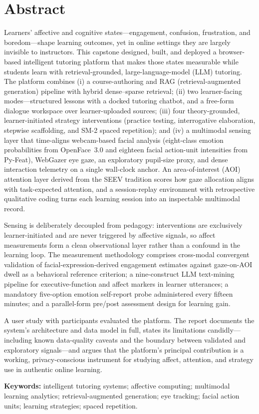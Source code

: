 \chapter*{Abstract}

Learners' affective and cognitive states---engagement, confusion,
frustration, and boredom---shape learning outcomes, yet in online settings
they are largely invisible to instructors. This capstone designed, built, and
deployed a browser-based intelligent tutoring platform that makes those
states measurable while students learn with retrieval-grounded,
large-language-model (LLM) tutoring. The platform combines (i) a
course-authoring and RAG (retrieval-augmented generation) pipeline with
hybrid dense--sparse retrieval; (ii) two learner-facing modes---structured
lessons with a docked tutoring chatbot, and a free-form dialogue workspace
over learner-uploaded sources; (iii) four theory-grounded, learner-initiated
strategy interventions (practice testing, interrogative elaboration,
stepwise scaffolding, and SM-2 spaced repetition); and (iv) a multimodal
sensing layer that time-aligns webcam-based facial analysis (eight-class
emotion probabilities from OpenFace~3.0 and eighteen facial action-unit
intensities from Py-Feat), WebGazer eye gaze, an exploratory pupil-size
proxy, and dense interaction telemetry on a single wall-clock anchor.
An area-of-interest (AOI) attention layer derived from the SEEV tradition
scores how gaze allocation aligns with task-expected attention, and a
session-replay environment with retrospective qualitative coding turns each
learning session into an inspectable multimodal record.

Sensing is deliberately decoupled from pedagogy: interventions are
exclusively learner-initiated and are never triggered by affective signals,
so affect measurements form a clean observational layer rather than a
confound in the learning loop. The measurement methodology comprises
cross-modal convergent validation of facial-expression-derived engagement
estimates against gaze-on-AOI dwell as a behavioral reference criterion;
a nine-construct LLM text-mining pipeline for executive-function and
affect markers in learner utterances; a mandatory five-option emotion
self-report probe administered every fifteen minutes; and a parallel-form
pre/post assessment design for learning gain.

A user study with  participants evaluated the platform.
  The report documents the
system's architecture and data model in full, states its limitations
candidly---including known data-quality caveats and the boundary between
validated and exploratory signals---and argues that the platform's principal
contribution is a working, privacy-conscious instrument for studying
affect, attention, and strategy use in authentic online learning.

\vspace{1em}
\noindent\textbf{Keywords:} intelligent tutoring systems; affective
computing; multimodal learning analytics; retrieval-augmented generation;
eye tracking; facial action units; learning strategies; spaced repetition.
\clearpage

